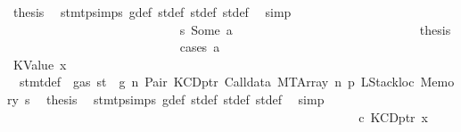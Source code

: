\begin{isabellebody}
\ {\isacharquery}{\kern0pt}thesis\ \isamarkupfalse%
\ stmt{\isachardot}{\kern0pt}psimps{\isacharparenleft}{\kern0pt}{}{\isacharparenright}{\kern0pt}\ g{\isacharunderscore}{\kern0pt}def\ st{\isacharprime}{\kern0pt}{\isacharunderscore}{\kern0pt}def\ st{\isacharprime}{\kern0pt}{\isacharprime}{\kern0pt}{\isacharunderscore}{\kern0pt}def\ st{\isacharprime}{\kern0pt}{\isacharprime}{\kern0pt}{\isacharprime}{\kern0pt}{\isacharunderscore}{\kern0pt}def\ \isamarkupfalse%
\ simp\isanewline
\ \ \ \ \ \ \ \ \ \ \ \ \ \ \ \ \ \ \ \ \ \ \ \ \isamarkupfalse%
\isanewline
\ \ \ \ \ \ \ \ \ \ \ \ \ \ \ \ \ \ \ \ \ \ \ \ \ \ \isamarkupfalse%
\ s{}{\isacharcolon}{\kern0pt}\ {\isacharparenleft}{\kern0pt}Some\ a{\isacharparenright}{\kern0pt}\isanewline
\ \ \ \ \ \ \ \ \ \ \ \ \ \ \ \ \ \ \ \ \ \ \ \ \ \ \isamarkupfalse%
\ \isamarkupfalse%
\ {\isacharquery}{\kern0pt}thesis\isanewline
\ \ \ \ \ \ \ \ \ \ \ \ \ \ \ \ \ \ \ \ \ \ \ \ \ \ \isamarkupfalse%
\ {\isacharparenleft}{\kern0pt}cases\ a{\isacharparenright}{\kern0pt}\isanewline
\ \ \ \ \ \ \ \ \ \ \ \ \ \ \ \ \ \ \ \ \ \ \ \ \ \ \ \ \isamarkupfalse%
\ {\isacharparenleft}{\kern0pt}KValue\ x{}{\isacharparenright}{\kern0pt}\isanewline
\ \ \ \ \ \ \ \ \ \ \ \ \ \ \ \ \ \ \ \ \ \ \ \ \ \ \ \ \isamarkupfalse%
\ {}{\isacharparenleft}{\kern0pt}{}{\isacharparenright}{\kern0pt}\ stmt{\isacharunderscore}{\kern0pt}def\ {\isacharbackquoteopen}{\isasymnot}\ gas\ st\ {\isasymle}\ g{\isacharbackquoteclose}\ n\ Pair\ KCDptr\ Calldata\ MTArray\ n{}\ p{}\ LStackloc\ Memory\ s{}\ \isamarkupfalse%
\ {\isacharquery}{\kern0pt}thesis\ \isamarkupfalse%
\ stmt{\isachardot}{\kern0pt}psimps{\isacharparenleft}{\kern0pt}{}{\isacharparenright}{\kern0pt}\ g{\isacharunderscore}{\kern0pt}def\ st{\isacharprime}{\kern0pt}{\isacharunderscore}{\kern0pt}def\ st{\isacharprime}{\kern0pt}{\isacharprime}{\kern0pt}{\isacharunderscore}{\kern0pt}def\ st{\isacharprime}{\kern0pt}{\isacharprime}{\kern0pt}{\isacharprime}{\kern0pt}{\isacharunderscore}{\kern0pt}def\ \isamarkupfalse%
\ simp\isanewline
\ \ \ \ \ \ \ \ \ \ \ \ \ \ \ \ \ \ \ \ \ \ \ \ \ \ \isamarkupfalse%
\isanewline
\ \ \ \ \ \ \ \ \ \ \ \ \ \ \ \ \ \ \ \ \ \ \ \ \ \ \ \ \isamarkupfalse%
\ c{}{\isacharcolon}{\kern0pt}\ {\isacharparenleft}{\kern0pt}KCDptr\ x{}{\isacharparenright}{\kern0pt}\isanewline

\end{isabellebody}
